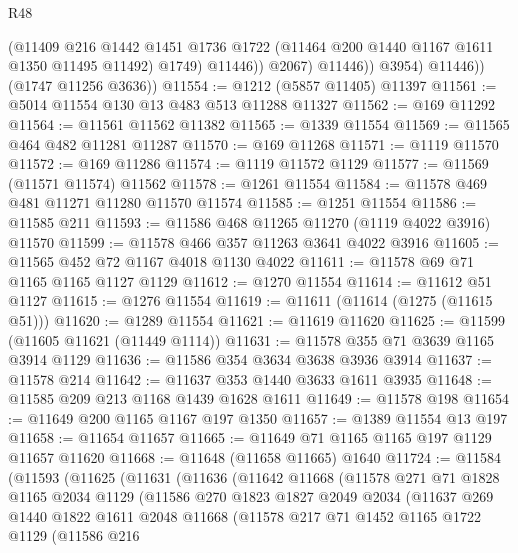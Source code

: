 \begin{lexlean}{R48}
\begin{coremodule}
                      (@11409
                        @216
                        @1442
                        @1451
                        @1736
                        @1722
                        (@11464 @200 @1440 @1167 @1611 @1350 @11495 @11492)
                        @1749)
                      @11446))
                  @2067)
                @11446))
            @3954)
          @11446))
      (@1747 @11256 @3636))
@11554 := @1212 (@5857 @11405) @11397
@11561 := @5014 @11554 @130 @13 @483 @513 @11288 @11327
@11562 := @169 @11292
@11564 := @11561 @11562 @11382
@11565 := @1339 @11554
@11569 := @11565 @464 @482 @11281 @11287
@11570 := @169 @11268
@11571 := @1119 @11570
@11572 := @169 @11286
@11574 := @1119 @11572 @1129
@11577 := @11569 (@11571 @11574) @11562
@11578 := @1261 @11554
@11584 := @11578 @469 @481 @11271 @11280 @11570 @11574
@11585 := @1251 @11554
@11586 := @11585 @211
@11593 := @11586 @468 @11265 @11270 (@1119 @4022 @3916) @11570
@11599 := @11578 @466 @357 @11263 @3641 @4022 @3916
@11605 := @11565 @452 @72 @1167 @4018 @1130 @4022
@11611 := @11578 @69 @71 @1165 @1165 @1127 @1129
@11612 := @1270 @11554
@11614 := @11612 @51 @1127
@11615 := @1276 @11554
@11619 := @11611 (@11614 (@1275 (@11615 @51)))
@11620 := @1289 @11554
@11621 := @11619 @11620
@11625 := @11599 (@11605 @11621 (@11449 @1114))
@11631 := @11578 @355 @71 @3639 @1165 @3914 @1129
@11636 := @11586 @354 @3634 @3638 @3936 @3914
@11637 := @11578 @214
@11642 := @11637 @353 @1440 @3633 @1611 @3935
@11648 := @11585 @209 @213 @1168 @1439 @1628 @1611
@11649 := @11578 @198
@11654 := @11649 @200 @1165 @1167 @197 @1350
@11657 := @1389 @11554 @13 @197
@11658 := @11654 @11657
@11665 := @11649 @71 @1165 @1165 @197 @1129 @11657 @11620
@11668 := @11648 (@11658 @11665) @1640
@11724 := @11584
    (@11593
      (@11625
        (@11631
          (@11636
            (@11642
              @11668
              (@11578
                @271
                @71
                @1828
                @1165
                @2034
                @1129
                (@11586
                  @270
                  @1823
                  @1827
                  @2049
                  @2034
                  (@11637
                    @269
                    @1440
                    @1822
                    @1611
                    @2048
                    @11668
                    (@11578
                      @217
                      @71
                      @1452
                      @1165
                      @1722
                      @1129
                      (@11586
                        @216

\end{coremodule}
\end{lexlean}
